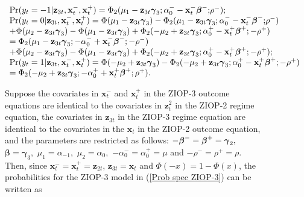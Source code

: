 \documentclass[letterpaper,fleqn,12pt]{article}
\begin{document}
\begin{figure}[H]
\begin{onehalfspace}
\begin{flushleft}
\begin{equation}
\begin{array}{l}
\Pr (y_{t}=-1|\mathbf{z}_{3t},\mathbf{x}_{t}^{-},\mathbf{x}_{t}^{+})=\Phi
_{2}(\mu _{1}-\mathbf{z}_{3t}\mathbf{\gamma }_{3};\alpha _{0}^{-}-\mathbf{x}%
_{t}^{-}\mathbf{\beta }^{-}\mathbf{;}\rho ^{-}); \\ 
\Pr (y_{t}=0|\mathbf{z}_{3t},\mathbf{x}_{t}^{-},\mathbf{x}_{t}^{+})=\Phi
(\mu _{1}-\mathbf{z}_{3t}\mathbf{\gamma }_{3})-\Phi _{2}(\mu _{1}-\mathbf{z}%
_{3t}\mathbf{\gamma }_{3};\alpha _{0}^{-}-\mathbf{x}_{t}^{-}\mathbf{\beta }%
^{-}\mathbf{;}\rho ^{-}) \\ 
+\Phi (\mu _{2}-\mathbf{z}_{3t}\mathbf{\gamma }_{3})-\Phi (\mu _{1}-\mathbf{z%
}_{3t}\mathbf{\gamma }_{3})+\Phi _{2}(-\mu _{2}+\mathbf{z}_{3t}\mathbf{%
\gamma }_{3};\alpha _{0}^{+}-\mathbf{x}_{t}^{+}\mathbf{\beta }^{+};\mathbf{-}%
\rho ^{+}) \\ 
=\Phi _{2}(\mu _{1}-\mathbf{z}_{3t}\mathbf{\gamma }_{3};-\alpha _{0}^{-}+%
\mathbf{x}_{t}^{-}\mathbf{\beta }^{-}\mathbf{;-}\rho ^{-}) \\ 
+\Phi (\mu _{2}-\mathbf{z}_{3t}\mathbf{\gamma }_{3})-\Phi (\mu _{1}-\mathbf{z%
}_{3t}\mathbf{\gamma }_{3})+\Phi _{2}(-\mu _{2}+\mathbf{z}_{3t}\mathbf{%
\gamma }_{3};\alpha _{0}^{+}-\mathbf{x}_{t}^{+}\mathbf{\beta }^{+};\mathbf{-}%
\rho ^{+}); \\ 
\Pr (y_{t}=1|\mathbf{z}_{3t},\mathbf{x}_{t}^{-},\mathbf{x}_{t}^{+})=\Phi
(-\mu _{2}+\mathbf{z}_{3t}\mathbf{\gamma }_{3})-\Phi _{2}(-\mu _{2}+\mathbf{z%
}_{3t}\mathbf{\gamma }_{3};\alpha _{0}^{+}-\mathbf{x}_{t}^{+}\mathbf{\beta }%
^{+};\mathbf{-}\rho ^{+}) \\ 
=\Phi _{2}(-\mu _{2}+\mathbf{z}_{3t}\mathbf{\gamma }_{3};-\alpha _{0}^{+}+%
\mathbf{x}_{t}^{+}\mathbf{\beta }^{+};\rho ^{+}).%
\end{array}
\label{Prob spec ZIOP-3}
\end{equation}
\end{flushleft}

Suppose the covariates in $\mathbf{x}_{t}^{-}$ and $\mathbf{x}_{t}^{+}$ in
the ZIOP-3 outcome equations are identical to the covariates in $\mathbf{z}%
_{t}^{2}$ in the ZIOP-2 regime equation, the covariates in $\mathbf{z}_{3t}$
in the ZIOP-3 regime equation are identical to the covariates in the $%
\mathbf{x}_{t}$ in the ZIOP-2 outcome equation, and the parameters are
restricted as follows: $-\mathbf{\beta }^{-}=\mathbf{\beta }^{+}=\mathbf{%
\gamma }_{2},$ $\mathbf{\beta }=\mathbf{\gamma }_{3},$ $\mu _{1}=\alpha
_{-1},$ $\mu _{2}=\alpha _{0},$ $-\alpha _{0}^{-}=\alpha _{0}^{+}=\mu $ and $%
-\rho ^{-}=\rho ^{+}=\rho $. Then, since $\mathbf{x}_{t}^{-}=\mathbf{x}%
_{t}^{+}=\mathbf{z}_{2t}$, $\mathbf{z}_{3t}=\mathbf{x}_{t}$ and $\Phi
(-x)=1-\Phi (x)$, the probabilities for the ZIOP-3 model in (\ref{Prob spec
ZIOP-3}) can be written as


\end{onehalfspace}
\end{figure}
\end{document}
